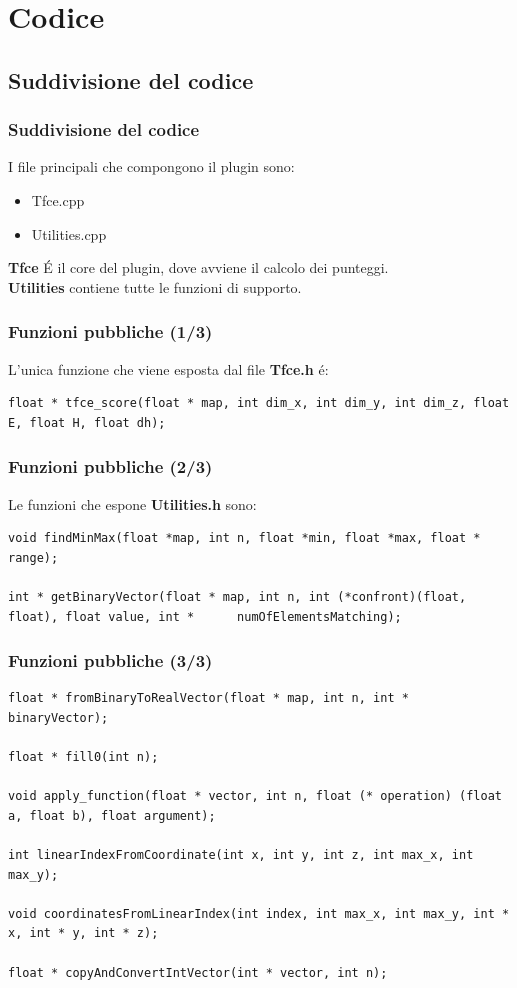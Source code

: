 \documentclass{beamer}
\begin{document}
\section{Codice}
\subsection{Suddivisione del codice}
\begin{frame}
\frametitle{Suddivisione del codice}
I file principali che compongono il plugin sono:
\begin{itemize}
\item{Tfce.cpp}
\item{Utilities.cpp}
\end{itemize}
\vfill
\textbf{Tfce} \'E il core del plugin, dove avviene il calcolo dei punteggi.\\
\smallskip
\textbf{Utilities} contiene tutte le funzioni di supporto.
\end{frame}

\begin{frame}[fragile]
\frametitle{Funzioni pubbliche (1/3)}
L'unica funzione che viene esposta dal file \textbf{Tfce.h} \'e:
\begin{center}
\begin{lstlisting}
float * tfce_score(float * map, int dim_x, int dim_y, int dim_z, float E, float H, float dh);
\end{lstlisting}
\end{center}
\end{frame}

\begin{frame}[fragile]
\frametitle{Funzioni pubbliche (2/3)}
Le funzioni che espone \textbf{Utilities.h} sono:
\begin{center}
\begin{lstlisting}
void findMinMax(float *map, int n, float *min, float *max, float * range);

int * getBinaryVector(float * map, int n, int (*confront)(float, float), float value, int *      numOfElementsMatching);
\end{lstlisting}
\end{center}
\end{frame}

\begin{frame}[fragile]
\frametitle{Funzioni pubbliche (3/3)}
\begin{center}
\begin{lstlisting}
float * fromBinaryToRealVector(float * map, int n, int * binaryVector);

float * fill0(int n);

void apply_function(float * vector, int n, float (* operation) (float a, float b), float argument);

int linearIndexFromCoordinate(int x, int y, int z, int max_x, int max_y);

void coordinatesFromLinearIndex(int index, int max_x, int max_y, int * x, int * y, int * z);

float * copyAndConvertIntVector(int * vector, int n);
\end{lstlisting}
\end{center}
\end{frame}
\end{document}
